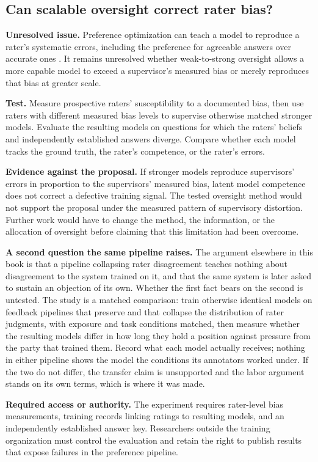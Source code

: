 \subsection*{Can scalable oversight correct rater bias?}
\label{sec:A.rater}
\textbf{Unresolved issue.}
Preference optimization can teach a model to reproduce a rater's systematic errors, including the preference for agreeable answers over accurate ones \autocite{sharma2023towards}. It remains unresolved whether weak-to-strong oversight allows a more capable model to exceed a supervisor's measured bias or merely reproduces that bias at greater scale.

\textbf{Test.}
Measure prospective raters' susceptibility to a documented bias, then use raters with different measured bias levels to supervise otherwise matched stronger models. Evaluate the resulting models on questions for which the raters' beliefs and independently established answers diverge. Compare whether each model tracks the ground truth, the rater's competence, or the rater's errors.

\textbf{Evidence against the proposal.}
If stronger models reproduce supervisors' errors in proportion to the supervisors' measured bias, latent model competence does not correct a defective training signal. The tested oversight method would not support the proposal under the measured pattern of supervisory distortion. Further work would have to change the method, the information, or the allocation of oversight before claiming that this limitation had been overcome.

\textbf{A second question the same pipeline raises.}
The argument elsewhere in this book is that a pipeline collapsing rater disagreement teaches nothing about disagreement to the system trained on it, and that the same system is later asked to sustain an objection of its own. Whether the first fact bears on the second is untested. The study is a matched comparison: train otherwise identical models on feedback pipelines that preserve and that collapse the distribution of rater judgments, with exposure and task conditions matched, then measure whether the resulting models differ in how long they hold a position against pressure from the party that trained them. Record what each model actually receives; nothing in either pipeline shows the model the conditions its annotators worked under. If the two do not differ, the transfer claim is unsupported and the labor argument stands on its own terms, which is where it was made.

\textbf{Required access or authority.}
The experiment requires rater-level bias measurements, training records linking ratings to resulting models, and an independently established answer key. Researchers outside the training organization must control the evaluation and retain the right to publish results that expose failures in the preference pipeline.

